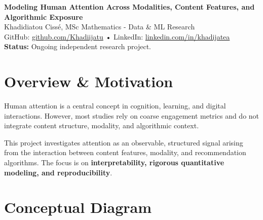 \documentclass[11pt,a4paper]{article}
\begin{document}
\begin{center}
    {\LARGE \textbf{Modeling Human Attention Across Modalities, Content Features, and Algorithmic Exposure}}\\[2mm]
    {\large Khadidiatou Cissé, MSc Mathematics - Data \& ML Research} \\[1mm]
    GitHub: \href{https://github.com/Khadiijatu}{github.com/Khadiijatu} \quad • \quad LinkedIn: \href{https://www.linkedin.com/in/khadijatea}{linkedin.com/in/khadijatea} \\[1mm]
    \textbf{Status:} Ongoing independent research project.
\end{center}

\vspace{5mm}

\section*{Overview \& Motivation}
Human attention is a central concept in cognition, learning, and digital interactions.  
However, most studies rely on coarse engagement metrics and do not integrate content structure, modality, and algorithmic context.  

This project investigates attention as an observable, structured signal arising from the interaction between content features, modality, and recommendation algorithms.  
The focus is on \textbf{interpretability, rigorous quantitative modeling, and reproducibility}.

\section*{Conceptual Diagram}
\begin{center}
\end{center}
\end{document}
